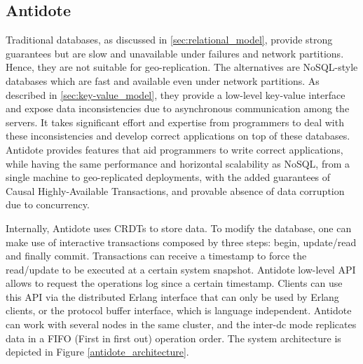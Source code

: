 \subsection{Antidote}
\label{sec:antidote_intro}
Traditional databases, as discussed in \ref{sec:relational_model}, provide strong guarantees but are slow and unavailable under failures and network partitions. Hence, they are not suitable for geo-replication. The alternatives are NoSQL-style databases which are fast and available even under network partitions. As described in \ref{sec:key-value_model}, they provide a low-level key-value interface and expose data inconsistencies due to asynchronous communication among the servers. It takes significant effort and expertise from programmers to deal with these inconsistencies and develop correct applications on top of these databases. Antidote\cite{site_antidote} provides features that aid programmers to write correct applications, while having the same performance and horizontal scalability as NoSQL, from a single machine to geo-replicated deployments, with the added guarantees of Causal Highly-Available Transactions, and provable absence of data corruption due to concurrency.\par
	Internally, Antidote uses CRDTs to store data. To modify the database, one can make use of interactive transactions composed by three steps: begin, update/read and finally commit. Transactions can receive a timestamp to force the read/update to be executed at a certain system snapshot. Antidote low-level API allows to request the operations log since a certain timestamp. Clients can use this API via the distributed Erlang interface that can only be used by Erlang clients, or the protocol buffer interface\cite{protocol_buffers}, which is language independent. Antidote can work with several nodes in the same cluster, and the inter-dc mode replicates data in a FIFO (First in first out) operation order. The system architecture is depicted in Figure \ref{antidote_architecture}.

